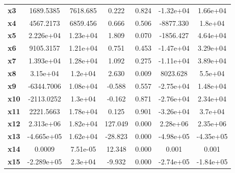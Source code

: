 \documentclass{article}
\begin{document}
\begin{center}
{\begin{tabular}{lcccccc}
\textbf{x3}    &    1689.5385  &     7618.685     &     0.222  &         0.824        &    -1.32e+04    &     1.66e+04     \\
\textbf{x4}    &    4567.2173  &     6859.456     &     0.666  &         0.506        &    -8877.330    &      1.8e+04     \\
\textbf{x5}    &    2.226e+04  &     1.23e+04     &     1.809  &         0.070        &    -1856.427    &     4.64e+04     \\
\textbf{x6}    &    9105.3157  &     1.21e+04     &     0.751  &         0.453        &    -1.47e+04    &     3.29e+04     \\
\textbf{x7}    &    1.393e+04  &     1.28e+04     &     1.092  &         0.275        &    -1.11e+04    &     3.89e+04     \\
\textbf{x8}    &     3.15e+04  &      1.2e+04     &     2.630  &         0.009        &     8023.628    &      5.5e+04     \\
\textbf{x9}    &   -6344.7006  &     1.08e+04     &    -0.588  &         0.557        &    -2.75e+04    &     1.48e+04     \\
\textbf{x10}   &   -2113.0252  &      1.3e+04     &    -0.162  &         0.871        &    -2.76e+04    &     2.34e+04     \\
\textbf{x11}   &    2221.5663  &     1.78e+04     &     0.125  &         0.901        &    -3.26e+04    &      3.7e+04     \\
\textbf{x12}   &    2.313e+06  &     1.82e+04     &   127.049  &         0.000        &     2.28e+06    &     2.35e+06     \\
\textbf{x13}   &   -4.665e+05  &     1.62e+04     &   -28.823  &         0.000        &    -4.98e+05    &    -4.35e+05     \\
\textbf{x14}   &       0.0009  &     7.51e-05     &    12.348  &         0.000        &        0.001    &        0.001     \\
\textbf{x15}   &   -2.289e+05  &      2.3e+04     &    -9.932  &         0.000        &    -2.74e+05    &    -1.84e+05     \\
\bottomrule
\end{tabular}}
\end{center}
\end{document}
